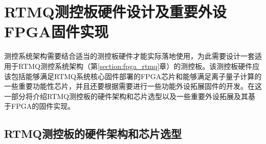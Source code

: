 








\section[RTMQ测控板硬件设计及重要外设FPGA固件实现]{RTMQ测控板硬件设计及重要外设FPGA固件实现}

测控系统架构需要结合适当的测控板硬件才能实际落地使用，为此需要设计一套适用于RTMQ测控系统架构（第\ref{section:fpga_rtmq}章）的测控板。该测控板硬件应该包括能够满足RTMQ系统核心固件部署的FPGA芯片和能够满足离子量子计算的一些重要功能性芯片，并且还要根据需要进行一些功能外设拓展固件的开发。在这一部分将介绍RTMQ测控板的硬件架构和芯片选型以及一些重要外设拓展及其基于FPGA的固件实现。

\subsection[RTMQ测控板的硬件架构和芯片选型]{RTMQ测控板的硬件架构和芯片选型}

